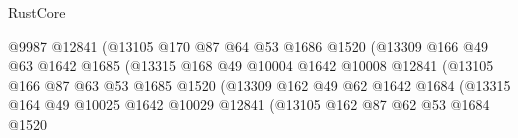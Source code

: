 \begin{lexlean}{RustCore}
\begin{coremodule}
                                        @9987
                                        @12841
                                        (@13105
                                          @170
                                          @87
                                          @64
                                          @53
                                          @1686
                                          @1520
                                          (@13309
                                            @166
                                            @49
                                            @63
                                            @1642
                                            @1685
                                            (@13315
                                              @168
                                              @49
                                              @10004
                                              @1642
                                              @10008
                                              @12841
                                              (@13105
                                                @166
                                                @87
                                                @63
                                                @53
                                                @1685
                                                @1520
                                                (@13309
                                                  @162
                                                  @49
                                                  @62
                                                  @1642
                                                  @1684
                                                  (@13315
                                                    @164
                                                    @49
                                                    @10025
                                                    @1642
                                                    @10029
                                                    @12841
                                                    (@13105
                                                      @162
                                                      @87
                                                      @62
                                                      @53
                                                      @1684
                                                      @1520

\end{coremodule}
\end{lexlean}
